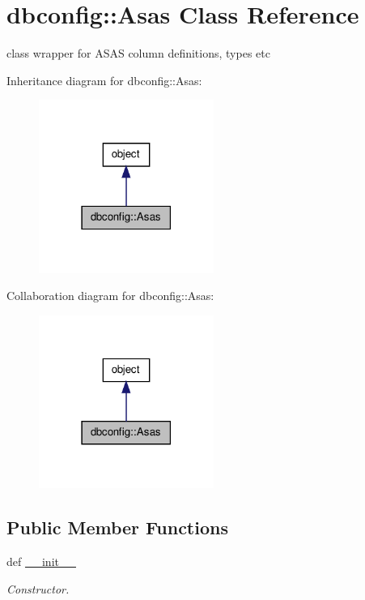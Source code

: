 \hypertarget{classdbconfig_1_1Asas}{
\section{dbconfig::Asas Class Reference}
\label{classdbconfig_1_1Asas}
}


class wrapper for ASAS column definitions, types etc  




Inheritance diagram for dbconfig::Asas:
\nopagebreak
\begin{figure}[H]
\begin{center}
\leavevmode
\includegraphics[width=162pt]{classdbconfig_1_1Asas__inherit__graph}
\end{center}
\end{figure}


Collaboration diagram for dbconfig::Asas:
\nopagebreak
\begin{figure}[H]
\begin{center}
\leavevmode
\includegraphics[width=162pt]{classdbconfig_1_1Asas__coll__graph}
\end{center}
\end{figure}
\subsection*{Public Member Functions}
\begin{DoxyCompactItemize}
\item 
def \hyperlink{classdbconfig_1_1Asas_a9c2ce09253fdd84b02778f86ac71e82f}{\_\-\_\-init\_\-\_\-}
\begin{DoxyCompactList}\small\item\em Constructor. \item\end{DoxyCompactList}\end{DoxyCompactItemize}
